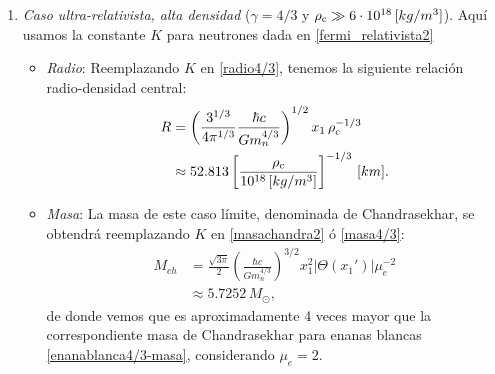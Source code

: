 \begin{enumerate}
\begin{itemize}
\end{itemize}

 \item \emph{Caso ultra-relativista, alta densidad} ($\gamma=4/3$ y $\rho_{\rm c}\gg6\cdot10^{18}\,[kg/m^3]$). Aquí usamos la constante $K$ para neutrones dada en \eqref{fermi_relativista2}
\begin{itemize}
 \item \emph{Radio}: Reemplazando $K$ en \eqref{radio4/3}, tenemos la siguiente relación radio-densidad central:
\begin{align}
R&=\left(\frac{3^{1/3}}{4\pi^{1/3}}\frac{\hbar c}{Gm_n^{4/3}}\right)^{1/2}x_1\,\rho_{\rm c}^{-1/3}\\
 &\approx52.813\left[\frac{\rho_{\rm c}}{10^{18}\,[kg/m^3]}\right]^{-1/3}\,[km].
\end{align}
\item \emph{Masa}: La masa de este caso límite, denominada de Chandrasekhar, se obtendrá reemplazando $K$ en \eqref{masachandra2} ó \eqref{masa4/3}:
\begin{align}\label{masachandra-neutrones}
M_{ch}&=\frac{\sqrt{3\pi}}{2}\left(\frac{\hbar c}{Gm_n^{4/3}}\right)^{3/2}x_1^2\left|\Theta(x_1')\right|\mu_e^{-2}\\
 &\approx5.7252\,M_{\odot},\label{neutrones4/3-masa}
\end{align}
de donde vemos que es aproximadamente 4 veces mayor que la correspondiente masa de Chandrasekhar para enanas blancas \eqref{enanablanca4/3-masa}, considerando $\mu_e=2$.
\end{itemize}


\end{enumerate}
